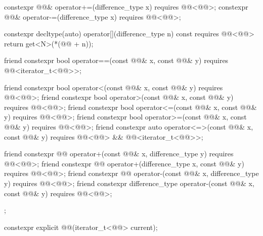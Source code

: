 \begin{codeblock}
{{    constexpr @@& operator+=(difference_type x)
      requires @@<@@>;
    constexpr @@& operator-=(difference_type x)
      requires @@<@@>;

    constexpr decltype(auto) operator[](difference_type n) const
      requires @@<@@>
    { return get<N>(*(@@ + n)); }

    friend constexpr bool operator==(const @@& x, const @@& y)
      requires @@<iterator_t<@@>>;

    friend constexpr bool operator<(const @@& x, const @@& y)
      requires @@<@@>;
    friend constexpr bool operator>(const @@& x, const @@& y)
      requires @@<@@>;
    friend constexpr bool operator<=(const @@& x, const @@& y)
      requires @@<@@>;
    friend constexpr bool operator>=(const @@& x, const @@& y)
      requires @@<@@>;
    friend constexpr auto operator<=>(const @@& x, const @@& y)
      requires @@<@@> && @@<iterator_t<@@>>;

    friend constexpr @@ operator+(const @@& x, difference_type y)
      requires @@<@@>;
    friend constexpr @@ operator+(difference_type x, const @@& y)
      requires @@<@@>;
    friend constexpr @@ operator-(const @@& x, difference_type y)
      requires @@<@@>;
    friend constexpr difference_type operator-(const @@& x, const @@& y)
      requires @@<@@>;
  };
}
\end{codeblock}

%
\begin{itemdecl}
constexpr explicit @@(iterator_t<@@> current);
\end{itemdecl}

